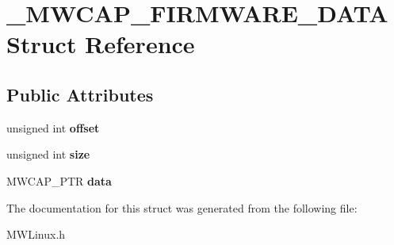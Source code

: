 \hypertarget{struct__MWCAP__FIRMWARE__DATA}{\section{\-\_\-\-M\-W\-C\-A\-P\-\_\-\-F\-I\-R\-M\-W\-A\-R\-E\-\_\-\-D\-A\-T\-A Struct Reference}
\label{struct__MWCAP__FIRMWARE__DATA}
}
\subsection*{Public Attributes}
\begin{DoxyCompactItemize}
\item 
\hypertarget{struct__MWCAP__FIRMWARE__DATA_afa76fe212fea22eb788b6ddf41403fbe}{unsigned int {\bfseries offset}}\label{struct__MWCAP__FIRMWARE__DATA_afa76fe212fea22eb788b6ddf41403fbe}

\item 
\hypertarget{struct__MWCAP__FIRMWARE__DATA_a9d827e7c6a6bc1a5c24843208daad7b5}{unsigned int {\bfseries size}}\label{struct__MWCAP__FIRMWARE__DATA_a9d827e7c6a6bc1a5c24843208daad7b5}

\item 
\hypertarget{struct__MWCAP__FIRMWARE__DATA_a4dd76b53ab42c42d675100740da231b1}{M\-W\-C\-A\-P\-\_\-\-P\-T\-R {\bfseries data}}\label{struct__MWCAP__FIRMWARE__DATA_a4dd76b53ab42c42d675100740da231b1}

\end{DoxyCompactItemize}


The documentation for this struct was generated from the following file\-:\begin{DoxyCompactItemize}
\item 
M\-W\-Linux.\-h\end{DoxyCompactItemize}

